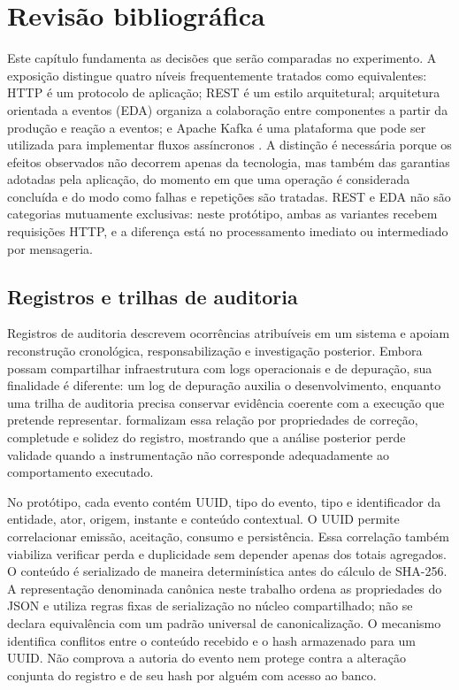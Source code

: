\chapter{Revisão bibliográfica}
\label{cap:revisao}

Este capítulo fundamenta as decisões que serão comparadas no experimento. A exposição distingue quatro níveis frequentemente tratados como equivalentes: HTTP é um protocolo de aplicação; REST é um estilo arquitetural; arquitetura orientada a eventos (EDA) organiza a colaboração entre componentes a partir da produção e reação a eventos; e Apache Kafka é uma plataforma que pode ser utilizada para implementar fluxos assíncronos \cite{fielding2002,aksakalli2021,kreps2011}. A distinção é necessária porque os efeitos observados não decorrem apenas da tecnologia, mas também das garantias adotadas pela aplicação, do momento em que uma operação é considerada concluída e do modo como falhas e repetições são tratadas. REST e EDA não são categorias mutuamente exclusivas: neste protótipo, ambas as variantes recebem requisições HTTP, e a diferença está no processamento imediato ou intermediado por mensageria.

\section{Registros e trilhas de auditoria}

Registros de auditoria descrevem ocorrências atribuíveis em um sistema e apoiam reconstrução cronológica, responsabilização e investigação posterior. Embora possam compartilhar infraestrutura com logs operacionais e de depuração, sua finalidade é diferente: um log de depuração auxilia o desenvolvimento, enquanto uma trilha de auditoria precisa conservar evidência coerente com a execução que pretende representar.  formalizam essa relação por propriedades de correção, completude e solidez do registro, mostrando que a análise posterior perde validade quando a instrumentação não corresponde adequadamente ao comportamento executado.

No protótipo, cada evento contém UUID, tipo do evento, tipo e identificador da entidade, ator, origem, instante e conteúdo contextual. O UUID permite correlacionar emissão, aceitação, consumo e persistência. Essa correlação também viabiliza verificar perda e duplicidade sem depender apenas dos totais agregados. O conteúdo é serializado de maneira determinística antes do cálculo de SHA-256. A representação denominada canônica neste trabalho ordena as propriedades do JSON e utiliza regras fixas de serialização no núcleo compartilhado; não se declara equivalência com um padrão universal de canonicalização. O mecanismo identifica conflitos entre o conteúdo recebido e o hash armazenado para um UUID. Não comprova a autoria do evento nem protege contra a alteração conjunta do registro e de seu hash por alguém com acesso ao banco.

